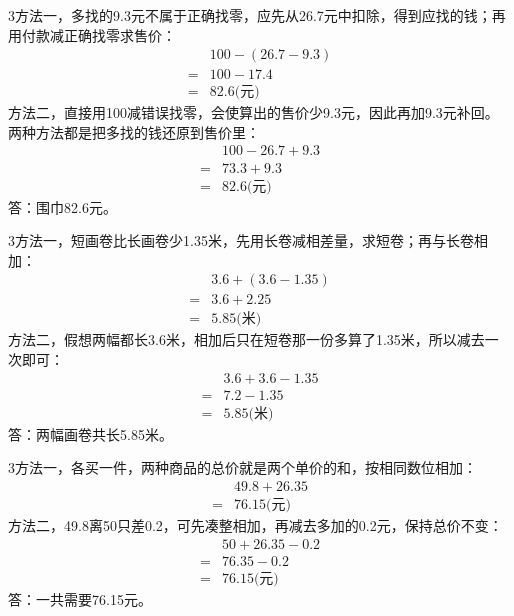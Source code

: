 \documentclass[multi=snippet,border={5bp 20bp 5bp 5bp}]{standalone}
\newenvironment{snippet}[3]{\begin{minipage}{#1bp}\color{answerred}\fontsize{#2}{#3}\selectfont\raggedright}{\end{minipage}}
\begin{document}
\begin{snippet}{505}{11.5}{14}\begin{multicols}{3}\raggedcolumns 方法一，多找的9.3元不属于正确找零，应先从26.7元中扣除，得到应找的钱；再用付款减正确找零求售价：\[\begin{aligned}&100-(26.7-9.3)\\={}&100-17.4\\={}&82.6\text{(元)}\end{aligned}\]方法二，直接用100减错误找零，会使算出的售价少9.3元，因此再加9.3元补回。两种方法都是把多找的钱还原到售价里：\[\begin{aligned}&100-26.7+9.3\\={}&73.3+9.3\\={}&82.6\text{(元)}\end{aligned}\]答：围巾82.6元。\end{multicols}\end{snippet}
\begin{snippet}{505}{11.5}{14}\begin{multicols}{3}\raggedcolumns 方法一，短画卷比长画卷少1.35米，先用长卷减相差量，求短卷；再与长卷相加：\[\begin{aligned}&3.6+(3.6-1.35)\\={}&3.6+2.25\\={}&5.85\text{(米)}\end{aligned}\]方法二，假想两幅都长3.6米，相加后只在短卷那一份多算了1.35米，所以减去一次即可：\[\begin{aligned}&3.6+3.6-1.35\\={}&7.2-1.35\\={}&5.85\text{(米)}\end{aligned}\]答：两幅画卷共长5.85米。\end{multicols}\end{snippet}
\begin{snippet}{505}{11.5}{14}\begin{multicols}{3}\raggedcolumns 方法一，各买一件，两种商品的总价就是两个单价的和，按相同数位相加：\[\begin{aligned}&49.8+26.35\\={}&76.15\text{(元)}\end{aligned}\]方法二，49.8离50只差0.2，可先凑整相加，再减去多加的0.2元，保持总价不变：\[\begin{aligned}&50+26.35-0.2\\={}&76.35-0.2\\={}&76.15\text{(元)}\end{aligned}\]答：一共需要76.15元。\end{multicols}\end{snippet}
\end{document}
